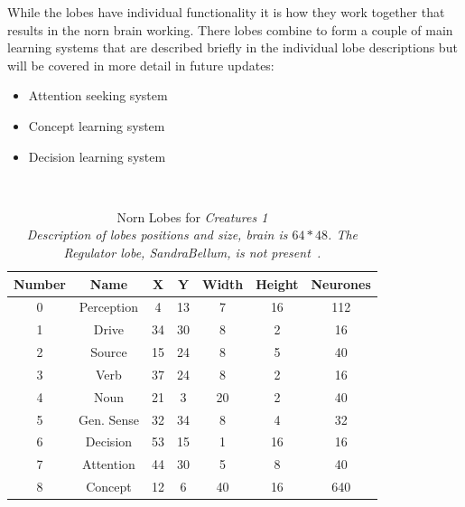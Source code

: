 \documentclass[11pt,twoside,a4paper]{article}
\begin{document}
While the lobes have individual functionality it is how they work together that results in the norn brain working. There lobes combine to form a couple of main learning systems that are described briefly in the individual lobe descriptions but will be covered in more detail in future updates:
\begin{itemize}
	\item Attention seeking system
	\item Concept learning system
	\item Decision learning system
\end{itemize}~\\


\begin{table}[ht]
	\begin{center} \begin{scriptsize}
	\begin{tabular}{|c|c|c|c|c|c|c|}
		\hline
	\rowcolor[gray]{0.75} 
	Number	&	Name	&	X	&	Y	&	Width	&	Height	&	Neurones \\ \hline
	0	&	Perception	&	4	&	13	&	7		&	16		&	112 \\ \hline
	1	&	Drive		&	34	&	30	&	8		&	2		&	16 \\ \hline
	2	&	Source		&	15	&	24	&	8		&	5		&	40 \\ \hline
	3	&	Verb		&	37	&	24	&	8		&	2		&	16 \\ \hline
	4	&	Noun		&	21	&	3	&	20		&	2		&	40 \\ \hline
	5	&	Gen. Sense	&	32	&	34	&	8		&	4		&	32 \\ \hline
	6	&	Decision	&	53	&	15	&	1		&	16		&	16 \\ \hline
	7	&	Attention	&	44	&	30	&	5		&	8		&	40 \\ \hline
	8	&	Concept		&	12	&	6	&	40		&	16		&	640 \\ \hline
	\end{tabular}
	\caption[Norn Lobes for \emph{Creatures 1}]{Norn Lobes for \emph{Creatures 1} \\ \emph{Description of lobes positions and size,  brain is $64*48$. The Regulator lobe, \textnormal{SandraBellum}, is not present~\cite{genornics}. } }
	\end{scriptsize} \end{center}
	\label{tab:nornsLobesPositionsCreatures1}
\end{table}
\end{document}
